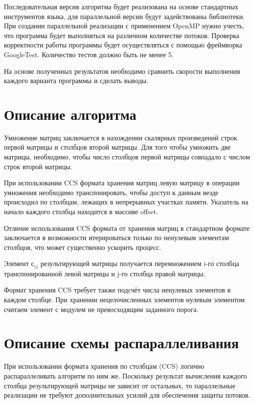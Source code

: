 \documentclass{report}
\begin{document}
\par Последовательная версия алгоритма будет реализована на основе стандартных инструментов языка, для параллельной версии будут задействованы библиотеки. При создании параллельной реализации с применением OpenMP нужно учесть, что программа будет выполняться на различном количестве потоков. Проверка корректности работы программы будет осуществляться с помощью фреймворка GoogleTest. Количество тестов должно быть не менее 5.
	
\par На основе полученных результатов необходимо сравнить скорости выполнения каждого варианта программы и сделать выводы.
\newpage

\section*{Описание алгоритма}
    \par Умножение матриц заключается в нахождении скалярных произведений строк первой матрицы и столбцов второй матрицы. Для того чтобы умножить две матрицы, необходимо, чтобы число столбцов первой матрицы совпадало с числом строк второй матрицы.
    
    \par При использовании CCS формата хранения матриц левую матрицу в операции умножения необходимо транспонировать, чтобы доступ к данным везде происходил по столбцам, лежащих в непрерывных участках памяти. Указатель на начало каждого столбца находится в массиве offset.
    
    \par Отличие использования CCS формата от хранения матриц в стандартном формате заключается в возможности итерироваться только по ненулевым элементам столбцов, что может существенно ускорить процесс.
    
    \par Элемент с$_{ij}$ результирующей матрицы получается перемножением i-го столбца транспонированной левой матрицы и j-го столбца правой матрицы.
    
    \par Формат хранения CCS требует также подсчёт числа ненулевых элементов в каждом столбце. При хранении нецелочисленных элементов нулевым элементом считаем элемент с модулем не превосходящим заданного порога.
\newpage

\section*{Описание схемы распараллеливания}
    \par При использовании формата хранения по столбцам (CCS) логично распараллеливать алгоритм по ним же. Поскольку результат вычисления каждого столбца результирующей матрицы не зависит от остальных, то параллельные реализации не требуют дополнительных усилий для обеспечения защиты потоков.
    
\end{document}
